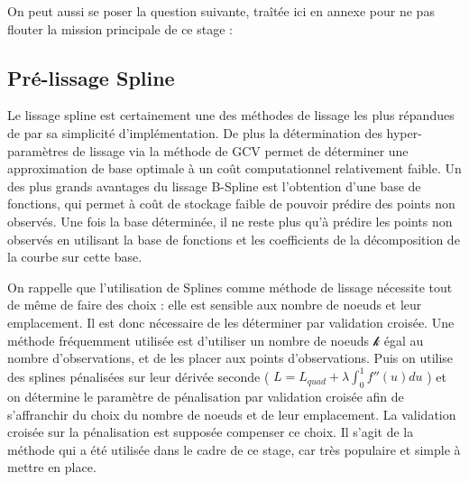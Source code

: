 On peut aussi se poser la question suivante, traîtée ici en annexe pour ne pas flouter la mission principale de ce stage :




\subsection{Pré-lissage Spline}

Le lissage spline est certainement une des méthodes de lissage les plus répandues de par sa simplicité d'implémentation. De plus la détermination des hyper-paramètres de lissage via la méthode de GCV permet de déterminer une approximation de base optimale à un coût computationnel relativement faible. Un des plus grands avantages du lissage B-Spline est l'obtention d'une base de fonctions, qui permet à coût de stockage faible de pouvoir prédire des points non observés. Une fois la base déterminée, il ne reste plus qu'à prédire les points non observés en utilisant la base de fonctions et les coefficients de la décomposition de la courbe sur cette base.

\bigskip

On rappelle que l'utilisation de Splines comme méthode de lissage nécessite tout de même de faire des choix : elle est sensible aux nombre de noeuds et leur emplacement. Il est donc nécessaire de les déterminer par validation croisée. Une méthode fréquemment utilisée est d'utiliser un nombre de noeuds $\mathcal k$ égal au nombre d'observations, et de les placer aux points d'observations. Puis on utilise des splines pénalisées sur leur dérivée seconde ( $L = L_{quad} + \lambda \displaystyle\int_0^1 f''(u) du$ ) et on détermine le paramètre de pénalisation par validation croisée afin de s'affranchir du choix du nombre de noeuds et de leur emplacement. La validation croisée sur la pénalisation est supposée compenser ce choix. Il s'agit de la méthode qui a été utilisée dans le cadre de ce stage, car très populaire et simple à mettre en place.


